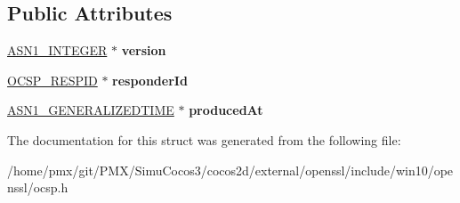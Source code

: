 \subsection*{Public Attributes}
\begin{DoxyCompactItemize}
\item 
\mbox{\label{structocsp__response__data__st_ab8d2433650a7535a807f54c97aa03e94}} 
\hyperlink{structasn1__string__st}{A\+S\+N1\+\_\+\+I\+N\+T\+E\+G\+ER} $\ast$ {\bfseries version}
\item 
\mbox{\label{structocsp__response__data__st_ad3f3152513fd758f44cec6d8b1d78375}} 
\hyperlink{structocsp__responder__id__st}{O\+C\+S\+P\+\_\+\+R\+E\+S\+P\+ID} $\ast$ {\bfseries responder\+Id}
\item 
\mbox{\label{structocsp__response__data__st_a70d47981b37a14ee1dabb1b8dd170e0d}} 
\hyperlink{structasn1__string__st}{A\+S\+N1\+\_\+\+G\+E\+N\+E\+R\+A\+L\+I\+Z\+E\+D\+T\+I\+ME} $\ast$ {\bfseries produced\+At}
\end{DoxyCompactItemize}


The documentation for this struct was generated from the following file\+:\begin{DoxyCompactItemize}
\item 
/home/pmx/git/\+P\+M\+X/\+Simu\+Cocos3/cocos2d/external/openssl/include/win10/openssl/ocsp.\+h\end{DoxyCompactItemize}

